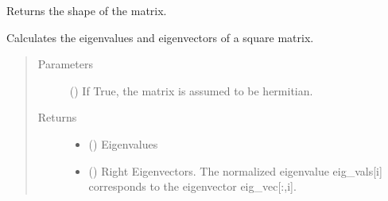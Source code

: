 \documentclass[letterpaper,10pt,english]{sphinxmanual}
\begin{document}
\begin{fulllineitems}

\begin{fulllineitems}
\label{\detokenize{qsim:qsim.matrix.OperatorMatrix.shape}}
Returns the shape of the matrix.

\end{fulllineitems}


\begin{fulllineitems}
\label{\detokenize{qsim:qsim.matrix.OperatorMatrix.spectral_decomposition}}
Calculates the eigenvalues and eigenvectors of a square matrix.
\begin{quote}\begin{description}
\item[{Parameters}] \leavevmode
{} () \textendash{} If True, the matrix is assumed to be hermitian.

\item[{Returns}] \leavevmode
\begin{itemize}
\item {} 
 () \textendash{} Eigenvalues

\item {} 
 () \textendash{} Right Eigenvectors. The normalized eigenvalue eig\_vals{[}i{]}
corresponds to the eigenvector eig\_vec{[}:,i{]}.

\end{itemize}


\end{description}\end{quote}

\end{fulllineitems}



\end{fulllineitems}
\end{document}
